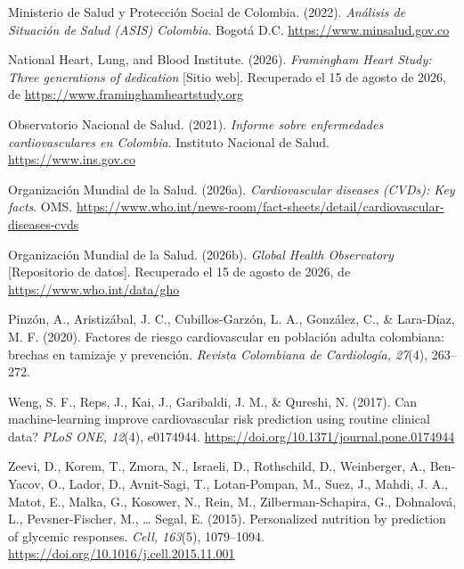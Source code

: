 \documentclass[12pt,letterpaper]{article}
\begin{document}
\begin{enumerate}[label={[\arabic*]}, leftmargin=2.2em]
\item Ministerio de Salud y Protección Social de Colombia. (2022).
\textit{Análisis de Situación de Salud (ASIS) Colombia}. Bogotá D.C.
\url{https://www.minsalud.gov.co}

\item National Heart, Lung, and Blood Institute. (2026). \textit{Framingham
Heart Study: Three generations of dedication} [Sitio web]. Recuperado el 15 de
agosto de 2026, de \url{https://www.framinghamheartstudy.org}

\item Observatorio Nacional de Salud. (2021). \textit{Informe sobre enfermedades
cardiovasculares en Colombia}. Instituto Nacional de Salud.
\url{https://www.ins.gov.co}

\item Organización Mundial de la Salud. (2026a). \textit{Cardiovascular diseases
(CVDs): Key facts}. OMS.
\url{https://www.who.int/news-room/fact-sheets/detail/cardiovascular-diseases-cvds}

\item Organización Mundial de la Salud. (2026b). \textit{Global Health
Observatory} [Repositorio de datos]. Recuperado el 15 de agosto de 2026, de
\url{https://www.who.int/data/gho}

\item Pinzón, A., Aristizábal, J. C., Cubillos-Garzón, L. A., González, C., \&
Lara-Díaz, M. F. (2020). Factores de riesgo cardiovascular en población adulta
colombiana: brechas en tamizaje y prevención. \textit{Revista Colombiana de
Cardiología, 27}(4), 263--272.

\item Weng, S. F., Reps, J., Kai, J., Garibaldi, J. M., \& Qureshi, N. (2017).
Can machine-learning improve cardiovascular risk prediction using routine
clinical data? \textit{PLoS ONE, 12}(4), e0174944.
\url{https://doi.org/10.1371/journal.pone.0174944}

\item Zeevi, D., Korem, T., Zmora, N., Israeli, D., Rothschild, D., Weinberger,
A., Ben-Yacov, O., Lador, D., Avnit-Sagi, T., Lotan-Pompan, M., Suez, J., Mahdi,
J. A., Matot, E., Malka, G., Kosower, N., Rein, M., Zilberman-Schapira, G.,
Dohnalová, L., Pevsner-Fischer, M., \ldots{} Segal, E. (2015). Personalized
nutrition by prediction of glycemic responses. \textit{Cell, 163}(5),
1079--1094. \url{https://doi.org/10.1016/j.cell.2015.11.001}

\end{enumerate}
\end{document}
